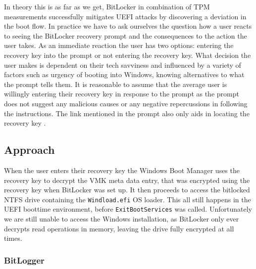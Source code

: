 In theory this is as far as we get, BitLocker in combination of \ac{TPM} measurements successfully mitigates \ac{UEFI} attacks by discovering a deviation in the boot flow.
In practice we have to ask ourselves the question how a user reacts to seeing the BitLocker recovery prompt and the consequences to the action the user takes.
As an immediate reaction the user has two options: entering the recovery key into the prompt or not entering the recovery key.
What decision the user makes is dependent on their tech savviness and influenced by a variety of factors such as urgency of booting into Windows, knowing alternatives to what the prompt tells them.
It is reasonable to assume that the average user is willingly entering their recovery key in response to the prompt as the prompt does not suggest any malicious causes or any negative repercussions in following the instructions.
The link mentioned in the prompt also only aids in locating the recovery key \cite{microsoft-recovery-key-faq}.



\subsection{Approach}

When the user enters their recovery key the Windows Boot Manager uses the recovery key to decrypt the \ac{VMK} meta data entry, that was encrypted using the recovery key when BitLocker was set up.
It then proceeds to access the bitlocked \ac{NTFS} drive containing the \lstinline{Windload.efi} \ac{OS} loader.
This all still happens in the \ac{UEFI} boottime environment, before \lstinline{ExitBootServices} was called.
Unfortunately we are still unable to access the Windows installation, as BitLocker only ever decrypts read operations in memory, leaving the drive fully encrypted at all times.

\subsubsection{BitLogger}

